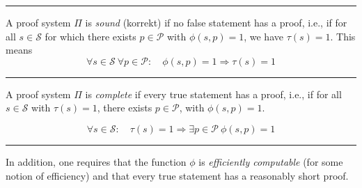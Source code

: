 \documentclass[a4paper]{extarticle}
\newcommand{\cS}{\mathcal{S}}
\newcommand{\cP}{\mathcal{P}}
\newcommand{\sep}{\vspace{5pt}\noindent\hrule\vspace{5pt}}
\begin{document}
\begin{multicols*}{2}
\sep

\Def[Soundness] A proof system $\Pi$ is \emph{sound} (korrekt) if no false
statement has a proof, i.e., if for all $s\in \cS$ for which there exists $p\in
\cP$ with $\phi(s,p)=1$, we have $\tau(s)=1$. This means 
\[ 
\forall s\in \cS \
\forall p\in \cP \colon \quad \phi(s,p)=1 \Longrightarrow \tau(s)=1 
\]

\sep

\Def[Completeness] A proof system $\Pi$ is \emph{complete} if every true
statement has a proof, i.e., if for all $s\in\cS$ with $\tau(s)=1$, there exists
$p\in\cP$, with $\phi(s,p)=1$.

\[
\forall s\in \cS\colon \quad 
\tau(s)=1 \Longrightarrow \exists p\in\cP \ \phi(s,p)=1 
\]

\sep

In addition, one requires that the function $\phi$ is \emph{efficiently
computable} (for some notion of efficiency) and that every true statement has a
reasonably short proof. 

\end{multicols*}
\end{document}
